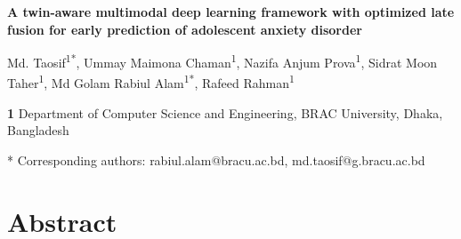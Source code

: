 \documentclass[10pt,letterpaper]{article}
\begin{document}
        \vspace*{0.2in}

        \begin{flushleft}
        {\Large
        \textbf{A twin-aware multimodal deep learning framework with optimized late fusion for early prediction of adolescent anxiety disorder}
        }
        \newline

        Md. Taosif\textsuperscript{1*},
        Ummay Maimona Chaman\textsuperscript{1},
        Nazifa Anjum Prova\textsuperscript{1},
        Sidrat Moon Taher\textsuperscript{1},
        Md Golam Rabiul Alam\textsuperscript{1*},
        Rafeed Rahman\textsuperscript{1}
        \\
        \bigskip

        \textbf{1} Department of Computer Science and Engineering, BRAC University, Dhaka, Bangladesh
        \\
        \bigskip

        * Corresponding authors: rabiul.alam@bracu.ac.bd, md.taosif@g.bracu.ac.bd

        \end{flushleft}


        \section*{Abstract}
\end{document}
